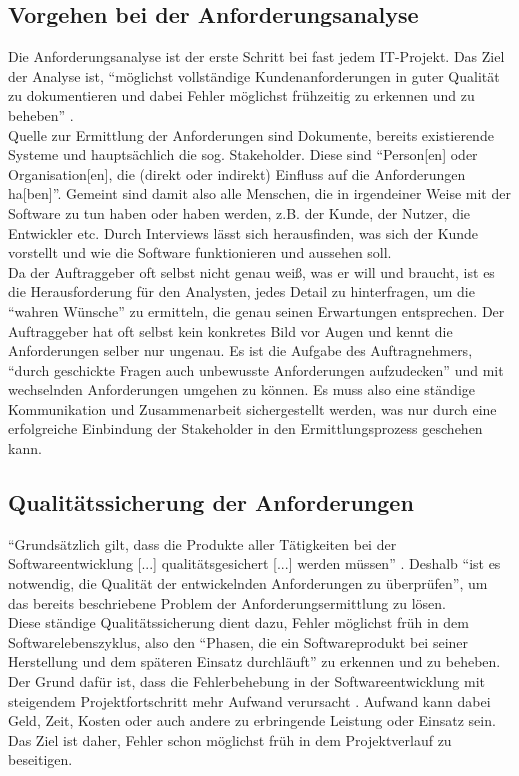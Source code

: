 \documentclass [12pt, a4paper, oneside, titlepage, ngerman]{article}
\begin{document}
\subsection{Vorgehen bei der Anforderungsanalyse}
Die Anforderungsanalyse ist der erste Schritt bei fast jedem IT-Projekt. Das Ziel der Analyse ist, "`möglichst vollständige Kundenanforderungen in guter Qualität zu dokumentieren und dabei Fehler möglichst frühzeitig zu erkennen und zu beheben"' \cite[S.11]{PohlRupp2015}. \\
Quelle zur Ermittlung der Anforderungen sind Dokumente, bereits existierende Systeme und hauptsächlich die sog. Stakeholder. Diese sind "`Person[en] oder Organisation[en], die (direkt oder indirekt) Einfluss auf die Anforderungen ha[ben]"'\cite[S.21]{PohlRupp2015}. Gemeint sind damit also alle Menschen, die in irgendeiner Weise mit der Software zu tun haben oder haben werden, z.B. der Kunde, der Nutzer, die Entwickler etc. Durch Interviews lässt sich herausfinden, was sich der Kunde vorstellt und wie die Software funktionieren und aussehen soll. \\
Da der Auftraggeber oft selbst nicht genau weiß, was er will und braucht, ist es die Herausforderung für den Analysten, jedes Detail zu hinterfragen, um die "`wahren Wünsche"' zu ermitteln, die genau seinen Erwartungen entsprechen. 
Der Auftraggeber hat oft selbst kein konkretes Bild vor Augen und kennt die Anforderungen selber nur ungenau. Es ist die Aufgabe des Auftragnehmers, "`durch geschickte Fragen auch unbewusste Anforderungen aufzudecken"'\cite[S.28]{PohlRupp2015} und mit wechselnden Anforderungen umgehen zu können.
Es muss also eine ständige Kommunikation und Zusammenarbeit sichergestellt werden, was nur durch eine erfolgreiche Einbindung der Stakeholder in den Ermittlungsprozess geschehen kann\cite[vgl. S. 33-34]{PohlRupp2015}.

\subsection{Qualitätssicherung der Anforderungen}
"`Grundsätzlich gilt, dass die Produkte aller Tätigkeiten bei der Softwareentwicklung [...] qualitätsgesichert [...] werden müssen"' \cite[S.55]{Winter1999}. Deshalb "`ist es notwendig, die Qualität der entwickelnden Anforderungen zu überprüfen"'\cite[S.95]{PohlRupp2015}, um das bereits beschriebene Problem der Anforderungsermittlung zu lösen. \\
Diese ständige Qualitätssicherung dient dazu, Fehler möglichst früh in dem Softwarelebenszyklus, also den "`Phasen, die ein Softwareprodukt bei seiner Herstellung und dem späteren Einsatz durchläuft"' \cite[S.173]{gabler} zu erkennen und zu beheben. Der Grund dafür ist, dass die Fehlerbehebung in der Softwareentwicklung mit steigendem Projektfortschritt mehr Aufwand verursacht \cite[vgl. S.2]{Hussmann}. Aufwand kann dabei Geld, Zeit, Kosten oder auch andere zu erbringende Leistung oder Einsatz sein. Das Ziel ist daher, Fehler schon möglichst früh in dem Projektverlauf zu beseitigen. \\
\end{document}
